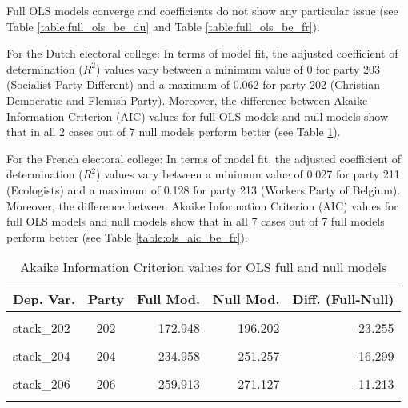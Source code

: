 \documentclass[
]{article}
\begin{document}
Full OLS models converge and coefficients do not show any particular issue (see Table
\ref{table:full_ols_be_du} and Table \ref{table:full_ols_be_fr}).

For the Dutch electoral college:
In terms of model fit, the adjusted coefficient of determination (\(R^2\)) values vary between
a minimum value of 0
for party 203
(Socialist Party Different)
and a maximum of 0.062
for party 202
(Christian Democratic and Flemish Party).
Moreover, the difference between Akaike Information Criterion (AIC) values for full OLS models and null
models show that in all 2 cases out of 7 null models perform better (see Table
\ref{table:ols_aic_be_du}).

For the French electoral college:
In terms of model fit, the adjusted coefficient of determination (\(R^2\)) values vary between
a minimum value of 0.027
for party 211
(Ecologists)
and a maximum of 0.128
for party 213
(Workers Party of Belgium).
Moreover, the difference between Akaike Information Criterion (AIC) values for full OLS models and null
models show that in all 7 cases out of 7 full models perform better (see Table
\ref{table:ols_aic_be_fr}).

\begin{table}[!h]

\caption{\label{tab:unnamed-chunk-11}Akaike Information Criterion values for OLS full and null models 
        \label{table:ols_aic_be_du}}
\centering
\begin{tabular}[t]{lcrrr}
\toprule
Dep. Var. & Party & Full Mod. & Null Mod. & Diff. (Full-Null)\\
\midrule
\cellcolor{gray!6}{stack\_201} & \cellcolor{gray!6}{201} & \cellcolor{gray!6}{218.286} & \cellcolor{gray!6}{221.796} & \cellcolor{gray!6}{-3.510}\\
stack\_202 & 202 & 172.948 & 196.202 & -23.255\\
\cellcolor{gray!6}{stack\_203} & \cellcolor{gray!6}{203} & \cellcolor{gray!6}{312.241} & \cellcolor{gray!6}{302.151} & \cellcolor{gray!6}{10.090}\\
stack\_204 & 204 & 234.958 & 251.257 & -16.299\\
\cellcolor{gray!6}{stack\_205} & \cellcolor{gray!6}{205} & \cellcolor{gray!6}{433.439} & \cellcolor{gray!6}{430.468} & \cellcolor{gray!6}{2.970}\\
\addlinespace
stack\_206 & 206 & 259.913 & 271.127 & -11.213\\
\cellcolor{gray!6}{stack\_207} & \cellcolor{gray!6}{207} & \cellcolor{gray!6}{498.332} & \cellcolor{gray!6}{499.672} & \cellcolor{gray!6}{-1.340}\\
\bottomrule
\end{tabular}
\end{table}
\end{document}
